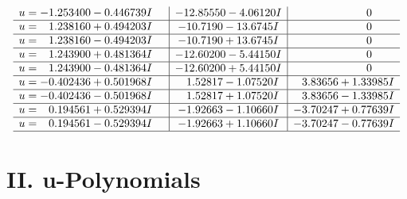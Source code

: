 \documentclass[1p]{elsarticle_modified}
\theoremstyle{definition}
\begin{document}
$$\begin{array}{c|c|c}
\begin{aligned}
u &= -1.253400 - 0.446739 I\end{aligned}
 & -12.85550 - 4.06120 I & \phantom{-0.000000 } 0 \\ \hline\begin{aligned}
u &= \phantom{-}1.238160 + 0.494203 I\end{aligned}
 & -10.7190 - 13.6745 I & \phantom{-0.000000 } 0 \\ \hline\begin{aligned}
u &= \phantom{-}1.238160 - 0.494203 I\end{aligned}
 & -10.7190 + 13.6745 I & \phantom{-0.000000 } 0 \\ \hline\begin{aligned}
u &= \phantom{-}1.243900 + 0.481364 I\end{aligned}
 & -12.60200 - 5.44150 I & \phantom{-0.000000 } 0 \\ \hline\begin{aligned}
u &= \phantom{-}1.243900 - 0.481364 I\end{aligned}
 & -12.60200 + 5.44150 I & \phantom{-0.000000 } 0 \\ \hline\begin{aligned}
u &= -0.402436 + 0.501968 I\end{aligned}
 & \phantom{-}1.52817 - 1.07520 I & \phantom{-}3.83656 + 1.33985 I \\ \hline\begin{aligned}
u &= -0.402436 - 0.501968 I\end{aligned}
 & \phantom{-}1.52817 + 1.07520 I & \phantom{-}3.83656 - 1.33985 I \\ \hline\begin{aligned}
u &= \phantom{-}0.194561 + 0.529394 I\end{aligned}
 & -1.92663 - 1.10660 I & -3.70247 + 0.77639 I \\ \hline\begin{aligned}
u &= \phantom{-}0.194561 - 0.529394 I\end{aligned}
 & -1.92663 + 1.10660 I & -3.70247 - 0.77639 I\\
 \hline 
 \end{array}$$\newpage
\newpage\renewcommand{\arraystretch}{1}
\centering \section*{ II. u-Polynomials}
\end{document}

